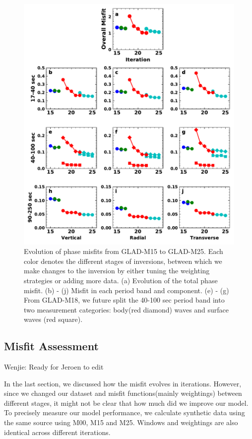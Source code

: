 \documentclass[extra,mreferee]{gji}
\begin{document}
\begin{figure}
  \centering
  \includegraphics[width=\textwidth]{figures/misfit.pdf}
  \caption{Evolution of phase misfits from GLAD-M15 to GLAD-M25.
  Each color denotes the different stages of inversions, between
  which we make changes to the inversion by either tuning the
  weighting strategies or adding more data.
  (a) Evolution of the total phase misfit. (b) - (j) Misfit in
  each period band and component. (e) - (g) From GLAD-M18,
  we future split the 40-100 sec period band into two
  measurement categories: body(red diamond) waves and surface waves
  (red square).}
  \label{fig:misfit}
\end{figure}

\subsection{Misfit Assessment}

{\color{Red} Wenjie: Ready for Jeroen to edit}

In the last section, we discussed how the misfit evolves in iterations. However, since
we changed our dataset and misfit functions(mainly weightings) between different stages,
it might not be clear that how much did we improve our model. To precisely measure
our model performance, we calculate synthetic data using the same source using M00, M15
and M25. Windows and weightings are also identical across different iterations.
\end{document}

